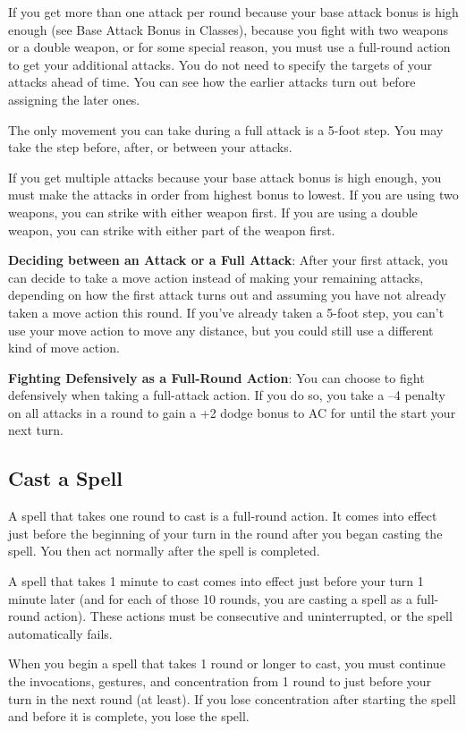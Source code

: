 				
If you get more than one attack per round because your base attack bonus is high enough (see Base Attack Bonus in Classes), because you fight with two weapons or a double weapon, or for some special reason, you must use a full-round action to get your additional attacks. You do not need to specify the targets of your attacks ahead of time. You can see how the earlier attacks turn out before assigning the later ones.
				
The only movement you can take during a full attack is a 5-foot step. You may take the step before, after, or between your attacks.
				
If you get multiple attacks because your base attack bonus is high enough, you must make the attacks in order from highest bonus to lowest. If you are using two weapons, you can strike with either weapon first. If you are using a double weapon, you can strike with either part of the weapon first.
				
\textbf{Deciding between an Attack or a Full Attack}: After your first attack, you can decide to take a move action instead of making your remaining attacks, depending on how the first attack turns out and assuming you have not already taken a move action this round. If you've already taken a 5-foot step, you can't use your move action to move any distance, but you could still use a different kind of move action.
				
\textbf{Fighting Defensively as a Full-Round Action}: You can choose to fight defensively when taking a full-attack action. If you do so, you take a --4 penalty on all attacks in a round to gain a +2 dodge bonus to AC for until the start your next turn.
				
\subsection{Cast a Spell}

				
A spell that takes one round to cast is a full-round action. It comes into effect just before the beginning of your turn in the round after you began casting the spell. You then act normally after the spell is completed.
				
A spell that takes 1 minute to cast comes into effect just before your turn 1 minute later (and for each of those 10 rounds, you are casting a spell as a full-round action). These actions must be consecutive and uninterrupted, or the spell automatically fails.
				
When you begin a spell that takes 1 round or longer to cast, you must continue the invocations, gestures, and concentration from 1 round to just before your turn in the next round (at least). If you lose concentration after starting the spell and before it is complete, you lose the spell.
				
